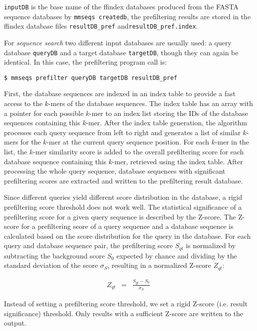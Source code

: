 \documentclass[11pt,a4paper]{scrreprt}
\begin{document}
\texttt{inputDB} is the base name of the ffindex databases produced from the FASTA sequence databases by \texttt{mmseqs createdb}, the prefiltering results are stored in the ffindex database files \texttt{resultDB\_pref} and\texttt{resultDB\_pref.index}.


For \emph{sequence search} two different input databases are usually used: a query database \texttt{queryDB} and a target database \texttt{targetDB}, though they can again be identical. In this case, the prefiltering program call is:


\begin{verbatim}
$ mmseqs prefilter queryDB targetDB resultDB_pref 
\end{verbatim}


First, the database sequences are indexed in an index table to provide a fast access to the $k$-mers of the database sequences. The index table has an array with a pointer for each possible $k$-mer to an index list storing the IDs of the database sequences containing this $k$-mer. After the index table generation, the algorithm processes each query sequence from left to right and generates a list of similar $k$-mers for the $k$-mer at the current query sequence position. For each $k$-mer in the list, the $k$-mer similarity score is added to the overall prefiltering score for each database sequence containing this $k$-mer, retrieved using the index table. After processing the whole query sequence, database sequences with significant prefiltering scores are extracted and written to the prefiltering result database. 


Since different queries yield different score distribution in the database, a rigid prefiltering score threshold does not work well. The statistical significance of a prefiltering score for a given query sequence is described by the Z-score. The Z-score for a prefiltering score of a query sequence and a database sequence is calculated based on the score distribution for the query in the database. For each query and database sequence pair, the prefiltering score $S_{qt}$ is normalized by subtracting the background score $S_{0}$ expected by chance and dividing by the standard deviation of the score $\sigma_{S}$, resulting in a normalized Z-score $Z_{qt}$:


\begin{eqnarray*}
Z_{qt} & = & \frac{S_{qt}-S_{0}}{\sigma_{S}}
\end{eqnarray*}


Instead of setting a prefiltering score threshold, we set a rigid Z-score (i.e. result significance) threshold. Only results with a sufficient Z-score are written to the output.
\end{document}
